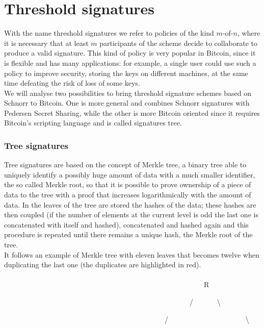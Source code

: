 \section{Threshold signatures}
With the name threshold signatures we refer to policies of the kind $m$-of-$n$, where it is necessary that at least $m$ participants of the scheme decide to collaborate to produce a valid signature. This kind of policy is very popular in Bitcoin, since it is flexible and has many applications: for example, a single user could use such a policy to improve security, storing the keys on different machines, at the same time defeating the risk of loss of some keys. 
\\
We will analyse two possibilities to bring threshold signature schemes based on Schnorr to Bitcoin. One is more general and combines Schnorr signatures with Pedersen Secret Sharing, while the other is more Bitcoin oriented since it requires Bitcoin's scripting language and is called signatures tree.

\subsubsection{Tree signatures}
Tree signatures are based on the concept of Merkle tree, a binary tree able to uniquely identify a possibly huge amount of data with a much smaller identifier, the so called Merkle root, so that it is possible to prove ownership of a piece of data to the tree with a proof that increases logarithmically with the amount of data. In the leaves of the tree are stored the hashes of the data; these hashes are then coupled (if the number of elements at the current level is odd the last one is concatenated with itself and hashed), concatenated and hashed again and this procedure is repeated until there remains a unique hash, the Merkle root of the tree. 
\\
It follows an example of Merkle tree with eleven leaves that becomes twelve when duplicating the last one (the duplicates are highlighted in red).
\\
\\

\ \ \ \ \ \ \ \ \ \ \ \ \ \ \ \ \ \ \ \ \ \ \ \ \ \ \ \ \ \ \ \ \ \ \ \ \ \ \ \ \ \ \ \ \ \ \ \ \ \ \ \ \ \ \ \ R

\ \ \ \ \ \ \ \ \ \ \ \ \ \ \ \ \ \ \ \ \ \ \ \ \ \ \ \ \ \ \ \ \ \ \ \ \ \ \ \ \ \ \ \ \ \ \ \ \ \ \ \ / \ \ \ \ \ \ \textbackslash

\ \ \ \ \ \ \ \ \ \ \ \ \ \ \ \ \ \ \ \ \ \ \ \ \ \ \ \ \ \ \ \ \ \ \ \ \ \ \ \ \ \ \ \ \ /  \ \ \ \ \ \ \ \ \ \ \ \ \ \ \ \ \ \ \ \ \ \textbackslash

